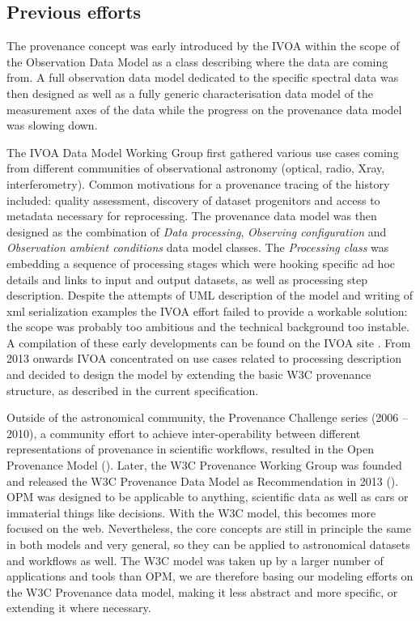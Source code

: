 \subsection{Previous efforts}
The provenance concept was early introduced by the IVOA within the scope of the Observation Data Model \citep[see IVOA note][]{note:observationdm} as a class describing where the data are coming from. A full observation data model dedicated to the specific spectral data was then designed \citep[Spectral Data Model,][]{std:SpectralDM} as well as a fully generic characterisation data model of the measurement axes of the data \citep[Characterisation Data Model][]{std:CharacterisationDM} while the progress on the provenance data model was slowing down.

The IVOA Data Model Working Group first gathered various use cases coming from different communities of observational astronomy (optical, radio, Xray, interferometry). Common motivations for a provenance tracing of the history included: quality assessment, discovery of dataset progenitors and access to metadata necessary for reprocessing. The provenance data model was then designed as the combination of \emph{Data processing}, \emph{Observing configuration} and \emph{Observation ambient conditions} data model classes. 
The \emph{Processing class} was embedding a sequence of processing stages which were hooking specific ad hoc details and links to input and output datasets, as well as processing step description. 
Despite the attempts of UML description of the model and writing of xml serialization examples the IVOA effort failed to provide a workable solution: the scope was probably too ambitious and the technical background too instable. A compilation of these early developments can be found on the IVOA site \citep{std:previousefforts}. From 2013 onwards IVOA concentrated on use cases related to processing description and decided to design the model by extending the basic W3C provenance structure, as described in the current specification. 

Outside of the astronomical community, the Provenance Challenge series (2006 -- 2010), a community effort to achieve inter-operability between different representations of provenance in scientific workflows, resulted in the Open Provenance Model (\cite{moreau2010}). 
Later, the W3C Provenance Working Group was founded and released the W3C Provenance Data Model as Recommendation in 2013 (\cite{std:W3CProvDM}). 
OPM was designed to be applicable to anything, scientific data as well as cars or immaterial things like decisions. With the W3C model, this becomes more focused on the web. Nevertheless, the core concepts are still in principle the same in both models and very general, so they can be applied to astronomical datasets and workflows as well. 
The W3C model was taken up by a larger number of applications and tools than OPM, we are therefore basing our modeling efforts on the W3C Provenance data model, making it less abstract and more specific, or extending it where necessary. 


